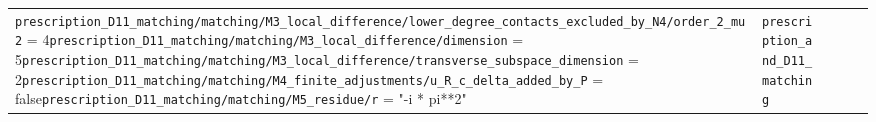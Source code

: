 {\begin{longtable}{@{}p{0.9cm}p{4.1cm}p{3.5cm}p{5.0cm}p{3.0cm}@{}}
\texttt{\allowbreak{}prescription\_\allowbreak{}D11\_\allowbreak{}matching/\allowbreak{}matching/\allowbreak{}M3\_\allowbreak{}local\_\allowbreak{}difference/\allowbreak{}lower\_\allowbreak{}degree\_\allowbreak{}contacts\_\allowbreak{}excluded\_\allowbreak{}by\_\allowbreak{}N4/\allowbreak{}order\_\allowbreak{}2\_\allowbreak{}mu2} = 4\newline \texttt{\allowbreak{}prescription\_\allowbreak{}D11\_\allowbreak{}matching/\allowbreak{}matching/\allowbreak{}M3\_\allowbreak{}local\_\allowbreak{}difference/\allowbreak{}dimension} = 5\newline \texttt{\allowbreak{}prescription\_\allowbreak{}D11\_\allowbreak{}matching/\allowbreak{}matching/\allowbreak{}M3\_\allowbreak{}local\_\allowbreak{}difference/\allowbreak{}transverse\_\allowbreak{}subspace\_\allowbreak{}dimension} = 2\newline \texttt{\allowbreak{}prescription\_\allowbreak{}D11\_\allowbreak{}matching/\allowbreak{}matching/\allowbreak{}M4\_\allowbreak{}finite\_\allowbreak{}adjustments/\allowbreak{}u\_\allowbreak{}R\_\allowbreak{}c\_\allowbreak{}delta\_\allowbreak{}added\_\allowbreak{}by\_\allowbreak{}P} = false\newline \texttt{\allowbreak{}prescription\_\allowbreak{}D11\_\allowbreak{}matching/\allowbreak{}matching/\allowbreak{}M5\_\allowbreak{}residue/\allowbreak{}r} = "-i * pi**2" & \texttt{prescription\_\allowbreak{}and\_\allowbreak{}D11\_\allowbreak{}matching} \\

\end{longtable}}
